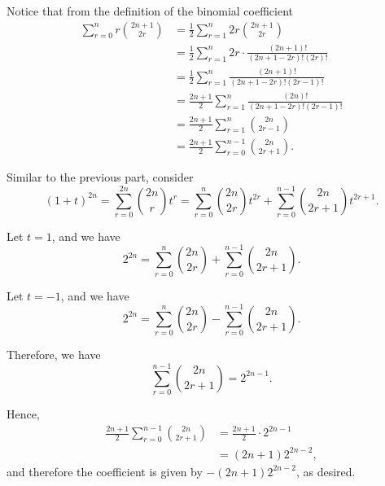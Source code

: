 \begin{enumerate}
          Notice that from the definition of the binomial coefficient
          \begin{align*}
              \sum_{r = 0}^{n} r \binom{2n + 1}{2r} & = \frac{1}{2} \sum_{r = 1}^{n} 2r \binom{2n + 1}{2r}                           \\
                                                    & = \frac{1}{2} \sum_{r = 1}^{n} 2r \cdot \frac{(2n + 1)!}{(2n + 1 - 2r)! (2r)!} \\
                                                    & = \frac{1}{2} \sum_{r = 1}^{n} \frac{(2n + 1)!}{(2n + 1 - 2r)! (2r - 1)!}      \\
                                                    & = \frac{2n + 1}{2} \sum_{r = 1}^{n} \frac{(2n)!}{(2n + 1 - 2r)! (2r - 1)!}     \\
                                                    & = \frac{2n + 1}{2} \sum_{r = 1}^{n} \binom{2n}{2r - 1}                         \\
                                                    & = \frac{2n + 1}{2} \sum_{r = 0}^{n - 1} \binom{2n}{2r + 1}.
          \end{align*}

          Similar to the previous part, consider
          \[
              (1 + t)^{2n} = \sum_{r = 0}^{2n} \binom{2n}{r} t^r = \sum_{r = 0}^{n} \binom{2n}{2r} t^{2r} + \sum_{r = 0}^{n - 1} \binom{2n}{2r + 1} t^{2r + 1}.
          \]

          Let \(t = 1\), and we have
          \[
              2^{2n} = \sum_{r = 0}^{n} \binom{2n}{2r} + \sum_{r = 0}^{n - 1} \binom{2n}{2r + 1}.
          \]

          Let \(t = -1\), and we have
          \[
              2^{2n} = \sum_{r = 0}^{n} \binom{2n}{2r} - \sum_{r = 0}^{n - 1} \binom{2n}{2r + 1}.
          \]

          Therefore, we have
          \[
              \sum_{r = 0}^{n - 1} \binom{2n}{2r + 1} = 2^{2n - 1}.
          \]

          Hence,
          \begin{align*}
              \frac{2n + 1}{2} \sum_{r = 0}^{n - 1} \binom{2n}{2r + 1} & = \frac{2n + 1}{2} \cdot 2^{2n - 1} \\
                                                                       & = (2n + 1) 2^{2n - 2},
          \end{align*}
          and therefore the coefficient is given by \(- (2n + 1) 2^{2n - 2}\), as desired.


\end{enumerate}
